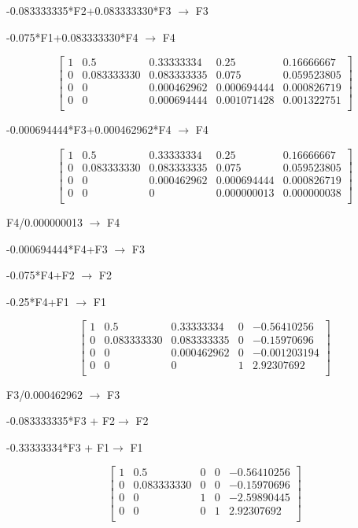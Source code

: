 \documentclass[12pt]{article}
\begin{document}
-0.083333335*F2+0.083333330*F3  $\longrightarrow $ F3

-0.075*F1+0.083333330*F4 $\longrightarrow $ F4

\[
\begin{bmatrix}
1 & 0.5 & 0.33333334 & 0.25 & 0.16666667 \\
0 & 0.083333330 & 0.083333335 & 0.075 & 0.059523805\\
0 & 0 & 0.000462962 & 0.000694444 & 0.000826719\\
0 & 0 & 0.000694444 & 0.001071428 & 0.001322751\\
\end{bmatrix}
\]

-0.000694444*F3+0.000462962*F4 $\longrightarrow $ F4

\[
\begin{bmatrix}
1 & 0.5 & 0.33333334 & 0.25 & 0.16666667 \\
0 & 0.083333330 & 0.083333335 & 0.075 & 0.059523805\\
0 & 0 & 0.000462962 & 0.000694444 & 0.000826719\\
0 & 0 & 0 & 0.000000013 & 0.000000038\\
\end{bmatrix}
\]


F4/0.000000013 $\longrightarrow $ F4

-0.000694444*F4+F3 $\longrightarrow $ F3

-0.075*F4+F2 $\longrightarrow $ F2

-0.25*F4+F1 $\longrightarrow $ F1

\[
\begin{bmatrix}
1 & 0.5 & 0.33333334 & 0 & -0.56410256\\
0 & 0.083333330 & 0.083333335 & 0 & -0.15970696\\
0 & 0 & 0.000462962 & 0 & -0.001203194\\
0 & 0 & 0 & 1 & 2.92307692\\
\end{bmatrix}
\]

F3/0.000462962 $\longrightarrow $ F3

-0.083333335*F3 + F2$\longrightarrow $ F2

-0.33333334*F3 + F1$\longrightarrow $ F1

\[
\begin{bmatrix}
1 & 0.5 & 0 & 0 & -0.56410256\\
0 & 0.083333330 & 0 & 0 & -0.15970696\\
0 & 0 & 1 & 0 & -2.59890445\\
0 & 0 & 0 & 1 & 2.92307692\\
\end{bmatrix}
\]
\end{document}
